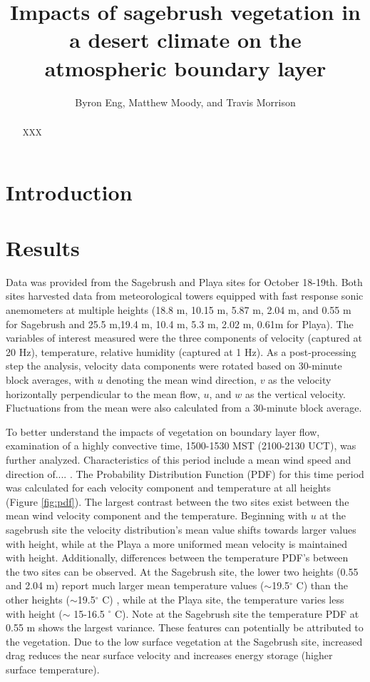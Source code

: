 \documentclass[]{article}
\title{Impacts of sagebrush vegetation in a desert climate on the atmospheric boundary layer}
\author{Byron Eng, Matthew Moody, and Travis Morrison}
\begin{document}
\maketitle

\begin{abstract}
XXX
\end{abstract}

\section{Introduction}

\section{Results}
Data was provided from the Sagebrush and Playa sites for October 18-19th. Both sites harvested data from meteorological towers equipped with fast response sonic anemometers at multiple heights (18.8 m, 10.15 m, 5.87 m, 2.04 m, and 0.55 m for Sagebrush and 25.5 m,19.4 m, 10.4 m, 5.3 m, 2.02 m, 0.61m for Playa). The variables of interest measured were the three components of velocity (captured at 20 Hz), temperature, relative humidity (captured at 1 Hz). As a post-processing step the analysis,  velocity data components were rotated based on 30-minute block averages, with $u$ denoting the mean wind direction, $v$ as the velocity horizontally perpendicular to the mean flow, $u$, and $w$ as the vertical velocity. Fluctuations from the mean were also calculated from a 30-minute block average. 


To better understand the impacts of vegetation on boundary layer flow, examination of a highly convective time, 1500-1530 MST (2100-2130 UCT), was further analyzed. Characteristics of this period include a mean wind speed and direction of.... . 
The Probability Distribution Function (PDF) for this time period was calculated for each velocity component and temperature at all heights (Figure \ref{fig:pdf}). The largest contrast between the two sites exist between the mean wind velocity component and the temperature. Beginning with $u$ at the sagebrush site the velocity distribution's mean value shifts towards larger values with height, while at the Playa a more uniformed mean velocity is maintained with height. Additionally, differences between the temperature PDF's between the two sites can be observed. At the Sagebrush site, the lower two heights (0.55 and 2.04 m) report much larger mean temperature values ($\sim$19.5$^\circ$ C) than the other heights ($\sim$19.5$^\circ$ C) , while at the Playa site, the temperature varies less with height ($\sim$ 15-16.5 $^\circ$ C). Note at the Sagebrush site the temperature PDF at 0.55 m shows the largest variance. These features can potentially be attributed to the vegetation. Due to the low surface vegetation at the Sagebrush site, increased drag reduces the near surface velocity and increases energy storage (higher surface temperature).  
\end{document}

